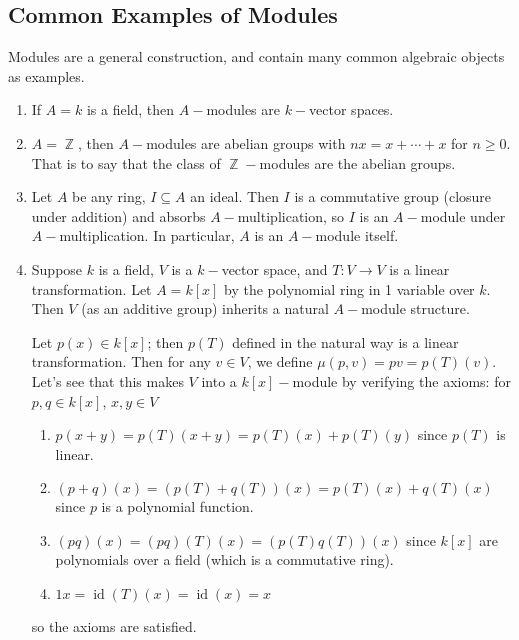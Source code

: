 \documentclass[11pt, a4paper]{memoir}
\DeclareMathOperator{\Z}{{\mathbb{Z}}}
\theoremstyle{change}
\theoremstyle{plain}
\theoremstyle{nonumberplain}
\DeclareMathOperator{\id}{id}
\numberwithin{equation}{section}
\begin{document}
\subsection{Common Examples of Modules}
Modules are a general construction, and contain many common algebraic objects as examples.
\begin{enumerate}
    \item If $A=k$ is a field, then $A-$modules are $k-$vector spaces.
    \item $A=\Z$, then $A-$modules are abelian groups with $nx=x+\cdots+x$ for $n\geq 0$.
        That is to say that the class of $\Z-$modules are the abelian groups.
    \item Let $A$ be any ring, $I\subseteq A$ an ideal.
        Then $I$ is a commutative group (closure under addition) and absorbs $A-$multiplication, so $I$ is an $A-$module under $A-$multiplication.
        In particular, $A$ is an $A-$module itself.
    \item Suppose $k$ is a field, $V$ is a $k-$vector space, and $T:V\to V$ is a linear transformation.
        Let $A=k[x]$ by the polynomial ring in 1 variable over $k$.
        Then $V$ (as an additive group) inherits a natural $A-$module structure.

        Let $p(x)\in k[x]$; then $p(T)$ defined in the natural way is a linear transformation.
        Then for any $v\in V$, we define $\mu(p,v)=pv=p(T)(v)$.
        Let's see that this makes $V$ into a $k[x]-$module by verifying the axioms: for $p,q\in k[x]$, $x,y\in V$
        \begin{enumerate}[nolistsep]
            \item $p(x+y)=p(T)(x+y)=p(T)(x)+p(T)(y)$ since $p(T)$ is linear.
            \item $(p+q)(x)=(p(T)+q(T))(x)=p(T)(x)+q(T)(x)$ since $p$ is a polynomial function.
            \item $(pq)(x)=(pq)(T)(x)=(p(T)q(T))(x)$ since $k[x]$ are polynomials over a field (which is a commutative ring).
            \item $1x=\id(T)(x)=\id(x)=x$
        \end{enumerate}
        so the axioms are satisfied.
\end{enumerate}
\end{document}
